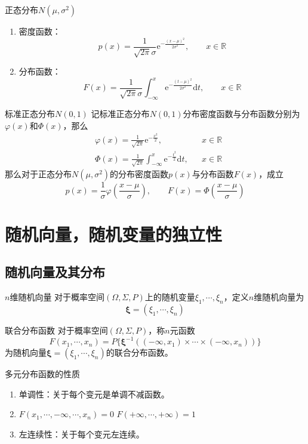 \documentclass[lang = cn, scheme = chinese, thmcnt = section]{elegantbook}
\newcommand{\R}{\mathbb{R}}            %
\begin{document}
\begin{definition}{正态分布$N(\mu,\sigma^2)$}
	\begin{enumerate}
		\item 密度函数：
		$$
		p(x)=\frac{1}{\sqrt{2\pi}\sigma}\mathrm{e}^{-\frac{(x-\mu)^2}{2\sigma^2}},\qquad x\in\R
		$$
		\item 分布函数：
		$$
		F(x)=\frac{1}{\sqrt{2\pi}\sigma}\int_{-\infty}^{x}{\mathrm{e}^{-\frac{(t-\mu)^2}{2\sigma^2}}\mathrm{d}t},\qquad x\in\R
		$$
	\end{enumerate}
\end{definition}

\begin{definition}{标准正态分布$N(0,1)$}
	记标准正态分布$N(0,1)$分布密度函数与分布函数分别为$\varphi(x)$和$\Phi(x)$，那么
	\begin{align*}
		& \varphi(x)=\frac{1}{\sqrt{2\pi}}\mathrm{e}^{-\frac{x^2}{2}},&& x\in\R\\
		& \Phi(x)=\frac{1}{\sqrt{2\pi}}\int_{-\infty}^{x}{\mathrm{e}^{-\frac{t^2}{2}}\mathrm{d}t},&& x\in\R
	\end{align*}
	那么对于正态分布$N(\mu,\sigma^2)$的分布密度函数$p(x)$与分布函数$F(x)$，成立
	$$
	p(x)=\frac{1}{\sigma}\varphi\left(\frac{x-\mu}{\sigma}\right),\qquad 
	F(x)=\Phi\left(\frac{x-\mu}{\sigma}\right)
	$$
\end{definition}

\section{随机向量，随机变量的独立性}

\subsection{随机向量及其分布}

\begin{definition}{$n$维随机向量}
	对于概率空间$(\Omega,\Sigma,P)$上的随机变量$\xi_1,\cdots,\xi_n$，定义$n$维随机向量为%
	$$
	\boldsymbol{\xi}=(\xi_1,\cdots,\xi_n)
	$$
\end{definition}

\begin{definition}{联合分布函数}
	对于概率空间$(\Omega,\Sigma,P)$，称$n$元函数
	$$
	F(x_1,\cdots,x_n)=P\{ \boldsymbol{\xi}^{-1}((-\infty,x_1)\times\cdots\times(-\infty,x_n)) \}
	$$
	为随机向量$\boldsymbol{\xi}=(\xi_1,\cdots,\xi_n)$的联合分布函数。
\end{definition}

\begin{proposition}{多元分布函数的性质}
	\begin{enumerate}
		\item 单调性：关于每个变元是单调不减函数。
		\item $F(x_1,\cdots,-\infty,\cdots,x_n)=0$
		$F(+\infty,\cdots,+\infty)=1$
		\item 左连续性：关于每个变元左连续。
	\end{enumerate}
\end{proposition}
\end{document}
